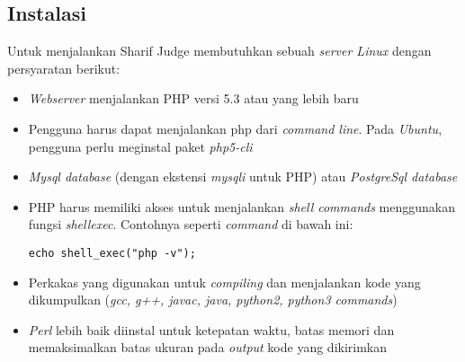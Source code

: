 \subsection{Instalasi}
Untuk menjalankan Sharif Judge membutuhkan sebuah \textit{server Linux} dengan persyaratan berikut:
\begin{itemize}
	\item \textit{Webserver} menjalankan PHP versi 5.3 atau yang lebih baru
	\item Pengguna harus dapat menjalankan php dari \textit{command line}. Pada \textit{Ubuntu}, pengguna perlu meginstal paket \textit{php5-cli}
	\item \textit{Mysql database} (dengan ekstensi \textit{mysqli} untuk PHP) atau \textit{PostgreSql database}
	\item PHP harus memiliki akses untuk menjalankan \textit{shell commands} menggunakan fungsi \textit{shell\textunderscore exec}. Contohnya seperti \textit{command} di bawah ini: 
		\begin{lstlisting}[backgroundcolor = \color{lightgray}]
		echo shell_exec("php -v");
		\end{lstlisting}
	\item Perkakas yang digunakan untuk \textit{compiling} dan menjalankan kode yang dikumpulkan (\textit{gcc, g++, javac, java, python2, python3 commands})
	\item \textit{Perl} lebih baik diinstal untuk ketepatan waktu, batas memori dan memaksimalkan batas ukuran pada \textit{output} kode yang dikirimkan
\end{itemize}


